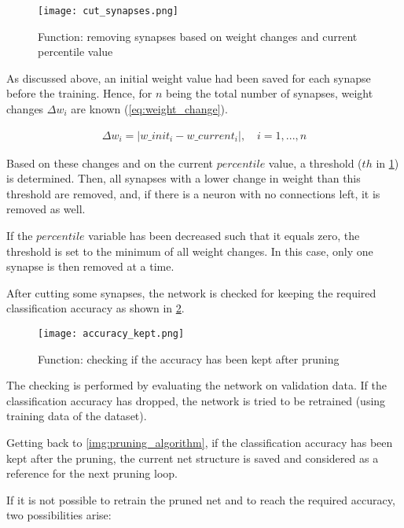\begin{figure}[H]
  \centering
  \texttt{[image: cut\_synapses.png]}
  \caption{Function: removing synapses based on weight changes and current percentile value}
  \label{img:cut_synapses}
\end{figure}

As discussed above, an initial weight value had been saved for each synapse before the training. Hence, for $ n $ being the total number of synapses, weight changes $ \Delta w_i $ are known (\ref{eq:weight_change}).

\begin{align} \label{eq:weight_change}
\Delta w_i = |w\_init_i - w\_current_i|, \quad i = 1, ..., n
\end{align}

Based on these changes and on the current $ percentile $ value, a threshold ($ th $ in \cref{img:cut_synapses}) is determined. Then, all synapses with a lower change in weight than this threshold are removed, and, if there is a neuron with no connections left, it is removed as well.

If the $ percentile $ variable has been decreased such that it equals zero, the threshold is set to the minimum of all weight changes. In this case, only one synapse is then removed at a time.

After cutting some synapses, the network is checked for keeping the required classification accuracy as shown in \cref{img:accuracy_kept}.

\begin{figure}[H]
  \centering
  \texttt{[image: accuracy\_kept.png]}
  \caption{Function: checking if the accuracy has been kept after pruning}
  \label{img:accuracy_kept}
\end{figure}

The checking is performed by evaluating the network on validation data. If the classification accuracy has dropped, the network is tried to be retrained (using training data of the dataset).

Getting back to \cref{img:pruning_algorithm}, if the classification accuracy has been kept after the pruning, the current net structure is saved and considered as a reference for the next pruning loop.

If it is not possible to retrain the pruned net and to reach the required accuracy, two possibilities arise:

